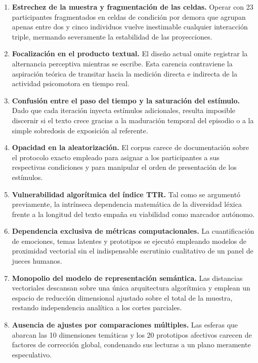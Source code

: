 \documentclass[12pt]{article}
\begin{document}
	\begin{enumerate}
		\item \textbf{Estrechez de la muestra y fragmentación de las celdas.} Operar con 23 participantes fragmentados en celdas de condición por demora que agrupan apenas entre dos y cinco individuos vuelve inestimable cualquier interacción triple, mermando severamente la estabilidad de las proyecciones.
		\item \textbf{Focalización en el producto textual.} El diseño actual omite registrar la alternancia perceptiva mientras se escribe. Esta carencia contraviene la aspiración teórica de transitar hacia la medición directa e indirecta de la actividad psicomotora en tiempo real.
		\item \textbf{Confusión entre el paso del tiempo y la saturación del estímulo.} Dado que cada iteración inyecta estímulos adicionales, resulta imposible discernir si el texto crece gracias a la maduración temporal del episodio o a la simple sobredosis de exposición al referente.
		\item \textbf{Opacidad en la aleatorización.} El corpus carece de documentación sobre el protocolo exacto empleado para asignar a los participantes a sus respectivas condiciones y para manipular el orden de presentación de los estímulos.
		\item \textbf{Vulnerabilidad algorítmica del índice TTR.} Tal como se argumentó previamente, la intrínseca dependencia matemática de la diversidad léxica frente a la longitud del texto empaña su viabilidad como marcador autónomo.
		\item \textbf{Dependencia exclusiva de métricas computacionales.} La cuantificación de emociones, temas latentes y prototipos se ejecutó empleando modelos de proximidad vectorial sin el indispensable escrutinio cualitativo de un panel de jueces humanos.
		\item \textbf{Monopolio del modelo de representación semántica.} Las distancias vectoriales descansan sobre una única arquitectura algorítmica y emplean un espacio de reducción dimensional ajustado sobre el total de la muestra, restando independencia analítica a los cortes parciales.
		\item \textbf{Ausencia de ajustes por comparaciones múltiples.} Las esferas que abarcan las 10 dimensiones temáticas y los 20 prototipos afectivos carecen de factores de corrección global, condenando sus lecturas a un plano meramente especulativo.
	\end{enumerate}
	
\end{document}
